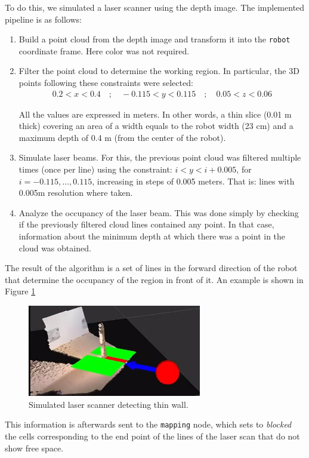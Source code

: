 To do this, we simulated a laser scanner using the depth image. The implemented pipeline is as follows:

\begin{enumerate}
\item Build a point cloud from the depth image and transform it into the \texttt{robot} coordinate frame. Here color was not required. 
\item Filter the point cloud to determine the working region. In particular, the 3D points following these constraints were selected:
\begin{align}
0.2 < x < 0.4 \quad ; \quad -0.115 < y < 0.115 \quad ;\quad 0.05 < z < 0.06
\end{align}

All the values are expressed in meters. In other words, a thin slice (0.01 m thick) covering an area of a width equals to the robot width (23 cm) and a maximum depth of 0.4 m (from the center of the robot).

\item Simulate laser beams. For this, the previous point cloud was filtered multiple times (once per line) using the constraint: $ i < y < i+0.005$, for $i = -0.115, \dots, 0.115$, increasing in steps of 0.005 meters. That is: lines with 0.005m resolution where taken. 
\item Analyze the occupancy of the laser beam. This was done simply by checking if the previously filtered cloud lines contained any point. In that case, information about the minimum depth at which there was a point in the cloud was obtained.
\end{enumerate}

The result of the algorithm is a set of lines in the forward direction of the robot that determine the occupancy of the region in front of it. An example is shown in Figure \ref{fig:laser}
\begin{figure}[h]
        \centering
        \includegraphics[height=4cm]{figures/laser.png}
        \caption{Simulated laser scanner detecting thin wall.}
        \label{fig:laser}
\end{figure}

This information is afterwards sent to the \texttt{mapping} node, which sets to \emph{blocked} the cells corresponding to the end point of the lines of the laser scan that do not show free space. 

